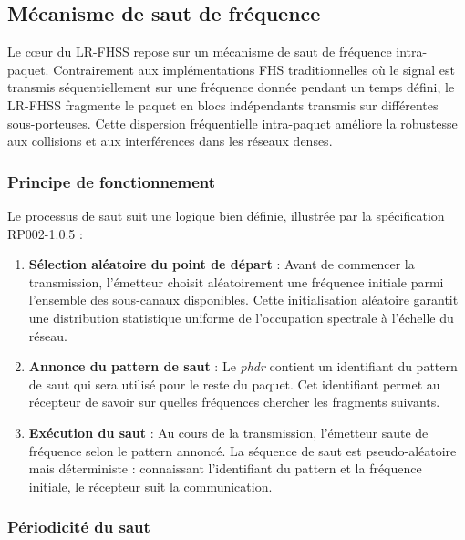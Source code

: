 \subsection{Mécanisme de saut de fréquence}

Le cœur du LR-FHSS repose sur un mécanisme de saut de fréquence intra-paquet. Contrairement aux implémentations FHS traditionnelles où le signal est transmis séquentiellement sur une fréquence donnée pendant un temps défini, le LR-FHSS fragmente le paquet en blocs indépendants transmis sur différentes sous-porteuses. Cette dispersion fréquentielle intra-paquet améliore la robustesse aux collisions et aux interférences dans les réseaux denses.

\subsubsection{Principe de fonctionnement}

Le processus de saut suit une logique bien définie, illustrée par la spécification RP002-1.0.5 \cite{loraalliance2025regional} :

\begin{enumerate}
	\item \textbf{Sélection aléatoire du point de départ} : Avant de commencer la transmission, l'émetteur choisit aléatoirement une fréquence initiale parmi l'ensemble des sous-canaux disponibles. Cette initialisation aléatoire garantit une distribution statistique uniforme de l'occupation spectrale à l'échelle du réseau.
	
	\item \textbf{Annonce du pattern de saut} : Le \textit{\gls{phdr}} contient un identifiant du pattern de saut qui sera utilisé pour le reste du paquet. Cet identifiant permet au récepteur de savoir sur quelles fréquences chercher les fragments suivants.
	
	\item \textbf{Exécution du saut} : Au cours de la transmission, l'émetteur saute de fréquence selon le pattern annoncé. La séquence de saut est pseudo-aléatoire mais déterministe : connaissant l'identifiant du pattern et la fréquence initiale, le récepteur suit la communication.
\end{enumerate}

\subsubsection{Périodicité du saut}

